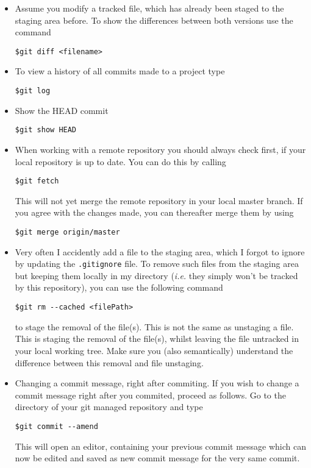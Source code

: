 \documentclass{article}
\begin{document}
\begin{itemize}

\item Assume you modify a tracked file, which has already been staged to the staging area before. To show the differences between both versions use the command
\begin{lstlisting}
$git diff <filename>
\end{lstlisting}

\item To view a history of all commits made to a project type
\begin{lstlisting}
$git log
\end{lstlisting}

\item Show the HEAD commit
\begin{lstlisting}
$git show HEAD
\end{lstlisting}

\item When working with a remote repository you should always check first, if your local repository is up to date.
You can do this by calling
\begin{lstlisting}
$git fetch
\end{lstlisting}
This will not yet merge the remote repository in your local master branch. If you agree with the changes made, you can thereafter merge them by using
\begin{lstlisting}
$git merge origin/master
\end{lstlisting}

\item Very often I accidently add a file to the staging area, which I forgot to ignore by updating the \verb|.gitignore| file.
To remove such files from the staging area but keeping them locally in my directory (\textit{i.e.} they simply won't be tracked by this repository), you can use the following command
\begin{lstlisting}
$git rm --cached <filePath>
\end{lstlisting}
to stage the removal of the file(s). This is not the same as unstaging a file. This is staging the removal of the file(s), whilst leaving the file untracked in your local working tree. Make sure you (also semantically) understand the difference
between this removal and file unstaging.

\item Changing a commit message, right after commiting.
If you wish to change a commit message right after you commited, proceed as follows. Go to the directory of your git managed repository and type
\begin{lstlisting}
$git commit --amend
\end{lstlisting}
This will open an editor, containing your previous commit message which can now be edited and saved as new commit message for the very same commit.

\end{itemize}
\end{document}
